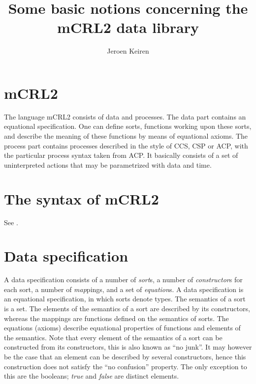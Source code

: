 \documentclass[a4paper,11pt]{article}
\title{Some basic notions concerning the mCRL2 data library}
\author{Jeroen Keiren}
\newcommand{\comment}[1]{\begin{quotation} {\sf *** #1 ***} \end{quotation}}
\begin{document}
\maketitle

\section{mCRL2}
The language mCRL2 consists of data and processes. The data part contains an equational specification. One can define sorts, functions working upon these sorts, and describe the meaning of these functions by means of equational axioms. The process part contains processes described in the style of CCS, CSP or ACP, with the particular process syntax taken from ACP. It basically consists of a set of uninterpreted actions that may be parametrized with data and time.

\section{The syntax of mCRL2}
See \cite[Appendix B]{groote07dubs}.

\section{Data specification}\label{sec:data_specification}
A data specification consists of a number of \emph{sort}s, a number of \emph{constructor}s for each sort, a number of \emph{map}pings, and a set of \emph{equation}s. A data specification is an equational specification, in which sorts denote types. The semantics of a sort is a set. The elements of the semantics of a sort are described by its constructors, whereas the mappings are functions defined on the semantics of sorts. The equations (axioms) describe equational properties of functions and elements of the semantics. Note that every element of the semantics of a sort can be constructed from its constructors, this is also known as ``no junk''. It may however be the case that an element can be described by several constructors, hence this construction does not satisfy the ``no confusion'' property. The only exception to this are the booleans; \emph{true} and \emph{false} are distinct elements.

%
\end{document}
